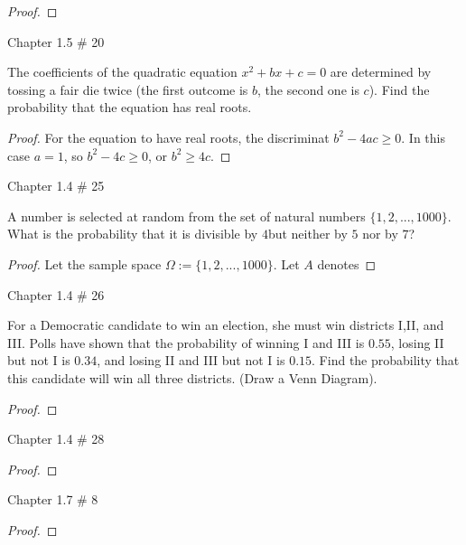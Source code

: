 \documentclass{article}
\begin{document}
\begin{proof}
\end{proof}

\newpage


\begin{ques}\label{q6}
    Chapter 1.5 \# 20

    The coefficients of the quadratic equation $x^2+bx+c=0$ are determined by tossing a fair die twice (the first outcome is $b$, the second one is $c$). Find the probability that the equation has real roots.
\end{ques}

\begin{proof}
    For the equation to have real roots, the discriminat $b^2 - 4ac\geq 0$. In this case $a=1$, so $b^2-4c\geq 0$, or $b^2\geq 4c$.


\end{proof}

\newpage

\begin{ques}\label{q7}
    Chapter 1.4 \# 25

    A number is selected at random from the set of natural numbers $\{1,2,...,1000\}$. What is the probability that it is divisible by $4$but neither by $5$ nor by $7$?
\end{ques}

\begin{proof}
    Let the sample space $\Omega:=\{1,2,...,1000\}$. Let $A$ denotes
\end{proof}

\newpage

\begin{ques}\label{q8}
    Chapter 1.4 \# 26

    For a Democratic candidate to win an election, she must win districts I,II, and III. Polls have shown that the probability of winning I and III is $0.55$, losing II but not I is $0.34$, and losing II and III but not I is $0.15$. Find the probability that this candidate will win all three districts. (Draw a Venn Diagram).
\end{ques}

\begin{proof}
\end{proof}

\newpage

\begin{ques}\label{q9}
    Chapter 1.4 \# 28
\end{ques}

\begin{proof}
\end{proof}

\newpage

\begin{ques}\label{q10}
    Chapter 1.7 \# 8
\end{ques}

\begin{proof}
\end{proof}

\newpage
\end{document}
